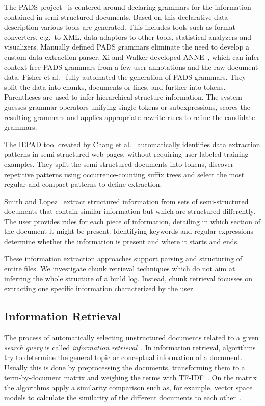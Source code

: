 \documentclass[\myrootdir/main.tex]{subfiles}
\begin{document}
The PADS project~\cite{fisher2011the-pads} is centered around declaring grammars for the information contained in semi-structured documents.
Based on this declarative data description various tools are generated.
This includes tools such as format converters, e.g.\ to XML, data adaptors to other tools, statistical analyzers and visualizers.
Manually defined PADS grammars eliminate the need to develop a custom data extraction parser.
Xi and Walker developed ANNE~\cite{xi2010a-context-free}, which can infer context-free PADS grammars from a few user annotations and the raw document data.
Fisher et al.~\cite{fisher2008from} fully automated the generation of PADS grammars.
They split the data into chunks, documents or lines, and further into tokens.
Parentheses are used to infer hierarchical structure information.
The system guesses grammar operators unifying single tokens or subexpressions, scores the resulting grammars and applies appropriate rewrite rules to refine the candidate grammars.

The IEPAD tool created by Chang et al.~\cite{chang2003automatic} automatically identifies data extraction patterns in semi-structured web pages, without requiring user-labeled training examples.
They split the semi-structured documents into tokens, discover repetitive patterns using occurrence-counting suffix trees and select the most regular and compact patterns to define extraction.

Smith and Lopez~\cite{smith1997information} extract structured information from sets of semi-structured documents that contain similar information but which are structured differently.
The user provides rules for each piece of information, detailing in which section of the document it might be present.
Identifying keywords and regular expressions determine whether the information is present and where it starts and ends.

These information extraction approaches support parsing and structuring of entire files.
We investigate chunk retrieval techniques which do not aim at inferring the whole structure of a build log.
Instead, chunk retrieval focusses on extracting one specific information characterized by the user.

\subsection{Information Retrieval}%
The process of automatically selecting unstructured documents related to a given \emph{search query} is called \emph{information retrieval}~\cite{schutze2008introduction}.
In information retrieval, algorithms try to determine the general topic or conceptual information of a document.
Usually this is done by preprocessing the documents, transforming them to a term-by-document matrix and weighing the terms with TF-IDF~\cite{lee1997document}.
On the matrix the algorithms apply a similarity comparison such as, for example, vector space models to calculate the similarity of the different documents to each other~\cite{panichella2016parameterizing}.
\end{document}
